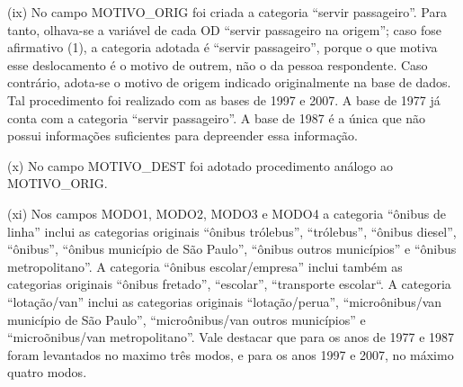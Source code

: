 \begin{compactitem}[]
\item(ix) No campo MOTIVO_ORIG foi criada a categoria ``servir passageiro''. Para tanto, olhava-se a variável de cada OD ``servir passageiro na origem''; caso fose afirmativo (1), a categoria adotada é ``servir passageiro'', porque o que motiva esse deslocamento é o motivo de outrem, não o da pessoa respondente. Caso contrário, adota-se o motivo de origem indicado originalmente na base de dados. Tal procedimento foi realizado com as bases de 1997 e 2007. A base de 1977 já conta com a categoria ``servir passageiro''. A base de 1987 é a única que não possui informações suficientes para depreender essa informação.
\item(x) No campo MOTIVO_DEST foi adotado procedimento análogo ao MOTIVO_ORIG.
\item (xi) Nos campos MODO1, MODO2, MODO3 e MODO4 a categoria ``ônibus de linha'' inclui as categorias originais ``ônibus trólebus'', ``trólebus'', ``ônibus diesel'', ``ônibus'', ``ônibus município de São Paulo'', ``ônibus outros municípios'' e ``ônibus metropolitano''. A categoria ``ônibus escolar/empresa'' inclui também as categorias originais ``ônibus fretado'', ``escolar'', ``transporte escolar``. A categoria ``lotação/van'' inclui as categorias originais ``lotação/perua'', ``microônibus/van município de São Paulo'', ``microônibus/van outros municípios'' e ``microõnibus/van metropolitano''. Vale destacar que para os anos de 1977 e 1987 foram levantados no maximo três modos, e para os anos 1997 e 2007, no máximo quatro modos.
\end{compactitem}

\clearpage
\newcommand{\layoutTamColA}{0.50cm}
\newcommand{\layoutTamColB}{3.20cm}
\newcommand{\layoutTamColC}{4.20cm}
\newcommand{\layoutTamColD}{0.90cm}
\newcommand{\layoutTamColE}{4.50cm}
\newcommand{\layoutColA}[2]{%
	\multicolumn{1}{|c|}{\multirow{#1}{\layoutTamColA}{\centering#2}}%
}
\newcommand{\layoutColB}[2]{\multicolumn{1}{c|}{\multirow{#1}{\layoutTamColB}{\centering#2}}}
\newcommand{\layoutColC}[2]{\multicolumn{1}{c|}{\multirow{#1}{\layoutTamColC}{\centering#2}}}
\newcommand{\layoutColD}[2]{\multicolumn{1}{c|}{\multirow{#1}{\layoutTamColD}{\centering#2}}}

